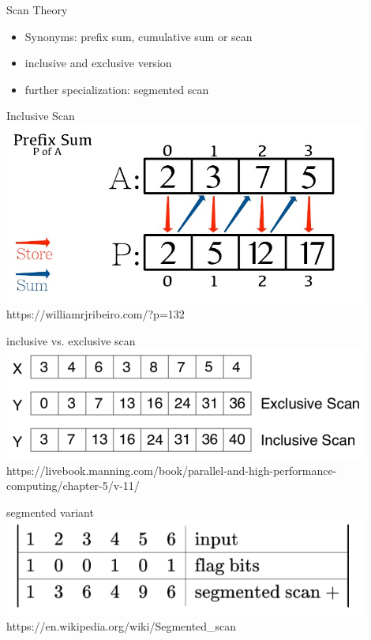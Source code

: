 \begin{frame}{Scan Theory}
	\begin{itemize}
		\item Synonyms: prefix sum, cumulative sum or scan
		\item inclusive and exclusive version
		\item further specialization: segmented scan
	\end{itemize}
\end{frame} 
\begin{frame}{Inclusive Scan}
	\centering
	\vspace{-5pt}
	\includegraphics[width=0.90\textwidth]{"wiki/prefix-sum.jpg"}
	\tiny https://williamrjribeiro.com/?p=132
\end{frame}
\begin{frame}{inclusive vs. exclusive scan}
	\centering
	\vspace{-5pt}
	\includegraphics[width=0.90\textwidth]{"wiki/scans.png"}
	\tiny https://livebook.manning.com/book/parallel-and-high-performance-computing/chapter-5/v-11/
\end{frame}
\begin{frame}{segmented variant}
	\centering
	\vspace{-5pt}
	\includegraphics[width=0.90\textwidth]{"wiki/SegmentedScan.png"}
	\tiny https://en.wikipedia.org/wiki/Segmented\_scan

\end{frame}

